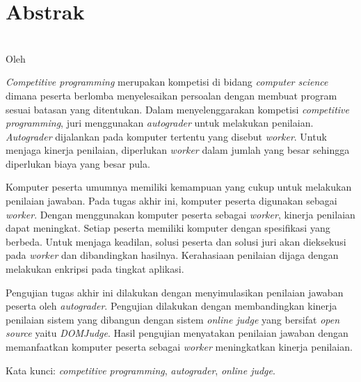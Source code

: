 \clearpage

\chapter*{Abstrak}

\begin{center}
    \textbf{\large {\MakeUppercase{\thetitle}}} \\
    \normalsize Oleh \theauthor
\end{center}

\singlespacing
\par \textit{Competitive programming} merupakan kompetisi di bidang \textit{computer science} dimana peserta berlomba menyelesaikan persoalan dengan membuat program sesuai batasan yang ditentukan. Dalam menyelenggarakan kompetisi \textit{competitive programming}, juri menggunakan \textit{autograder} untuk melakukan penilaian. \textit{Autograder} dijalankan pada komputer tertentu yang disebut \textit{worker}. Untuk menjaga kinerja penilaian, diperlukan \textit{worker} dalam jumlah yang besar sehingga diperlukan biaya yang besar pula. 

\par Komputer peserta umumnya memiliki kemampuan yang cukup untuk melakukan penilaian jawaban. Pada tugas akhir ini, komputer peserta digunakan sebagai \textit{worker}. Dengan menggunakan komputer peserta sebagai \textit{worker}, kinerja penilaian dapat meningkat. Setiap peserta memiliki komputer dengan spesifikasi yang berbeda. Untuk menjaga keadilan, solusi peserta dan solusi juri akan dieksekusi pada \textit{worker} dan dibandingkan hasilnya. Kerahasiaan penilaian dijaga dengan melakukan enkripsi pada tingkat aplikasi.

\par Pengujian tugas akhir ini dilakukan dengan menyimulasikan penilaian jawaban peserta oleh \textit{autograder}. Pengujian dilakukan dengan membandingkan kinerja penilaian sistem yang dibangun dengan sistem \textit{online judge} yang bersifat \textit{open source} yaitu \textit{DOMJudge}. Hasil pengujian menyatakan penilaian jawaban dengan memanfaatkan komputer peserta sebagai \textit{worker} meningkatkan kinerja penilaian.

\par Kata kunci: \textit{competitive programming}, \textit{autograder}, \textit{online judge}.

\clearpage
\onehalfspacing